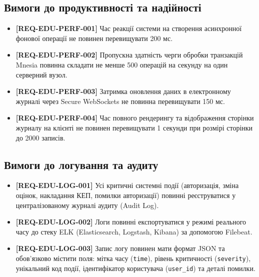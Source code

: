 \documentclass{article}
\begin{document}
\subsection{Вимоги до продуктивності та надійності}
\begin{itemize}
    \item \textbf{[REQ-EDU-PERF-001]} Час реакції системи на створення асинхронної фонової операції не повинен перевищувати 200 мс.
    \item \textbf{[REQ-EDU-PERF-002]} Пропускна здатність черги обробки транзакцій Mnesia повинна складати не менше 500 операцій на секунду на один серверний вузол.
    \item \textbf{[REQ-EDU-PERF-003]} Затримка оновлення даних в електронному журналі через Secure WebSockets не повинна перевищувати 150 мс.
    \item \textbf{[REQ-EDU-PERF-004]} Час повного рендерингу та відображення сторінки журналу на клієнті не повинен перевищувати 1 секунди при розмірі сторінки до 2000 записів.
\end{itemize}

\subsection{Вимоги до логування та аудиту}
\begin{itemize}
    \item \textbf{[REQ-EDU-LOG-001]} Усі критичні системні події (авторизація, зміна оцінок, накладання КЕП, помилки авторизації) повинні реєструватися у централізованому журналі аудиту (Audit Log).
    \item \textbf{[REQ-EDU-LOG-002]} Логи повинні експортуватися у режимі реального часу до стеку ELK (Elasticsearch, Logstash, Kibana) за допомогою Filebeat.
    \item \textbf{[REQ-EDU-LOG-003]} Запис логу повинен мати формат JSON та обов'язково містити поля: мітка часу (\texttt{time}), рівень критичності (\texttt{severity}), унікальний код події, ідентифікатор користувача (\texttt{user\_id}) та деталі помилки.
\end{itemize}
\end{document}
